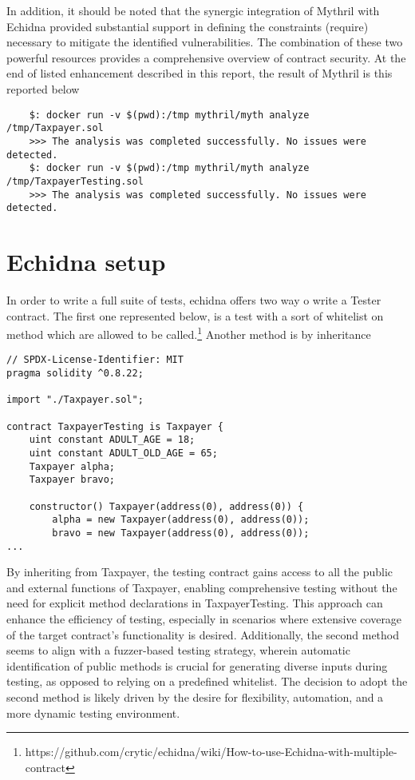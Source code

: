 \documentclass{article}
\begin{document}
In addition, it should be noted that the synergic integration of Mythril with Echidna provided substantial support in defining the constraints (require) necessary to mitigate the identified vulnerabilities. The combination of these two powerful resources provides a comprehensive overview of contract security.
At the end of listed enhancement described in this report, the result of Mythril is this reported below
\begin{verbatim}
    $: docker run -v $(pwd):/tmp mythril/myth analyze /tmp/Taxpayer.sol
    >>> The analysis was completed successfully. No issues were detected.
    $: docker run -v $(pwd):/tmp mythril/myth analyze /tmp/TaxpayerTesting.sol
    >>> The analysis was completed successfully. No issues were detected.
\end{verbatim}

\section{Echidna setup}
In order to write a full suite of tests, echidna offers two way o write a Tester contract. The first one represented below, is a test with a sort of whitelist on method which are allowed to be called.\footnote{https://github.com/crytic/echidna/wiki/How-to-use-Echidna-with-multiple-contract}
Another method is by inheritance
\begin{verbatim}
// SPDX-License-Identifier: MIT
pragma solidity ^0.8.22;

import "./Taxpayer.sol";

contract TaxpayerTesting is Taxpayer {
    uint constant ADULT_AGE = 18;
    uint constant ADULT_OLD_AGE = 65;
    Taxpayer alpha;
    Taxpayer bravo;

    constructor() Taxpayer(address(0), address(0)) {
        alpha = new Taxpayer(address(0), address(0));
        bravo = new Taxpayer(address(0), address(0));
...
\end{verbatim}
By inheriting from Taxpayer, the testing contract gains access to all the public and external functions of Taxpayer, enabling comprehensive testing without the need for explicit method declarations in TaxpayerTesting. This approach can enhance the efficiency of testing, especially in scenarios where extensive coverage of the target contract's functionality is desired. Additionally, the second method seems to align with a fuzzer-based testing strategy, wherein automatic identification of public methods is crucial for generating diverse inputs during testing, as opposed to relying on a predefined whitelist. The decision to adopt the second method is likely driven by the desire for flexibility, automation, and a more dynamic testing environment.
\end{document}

